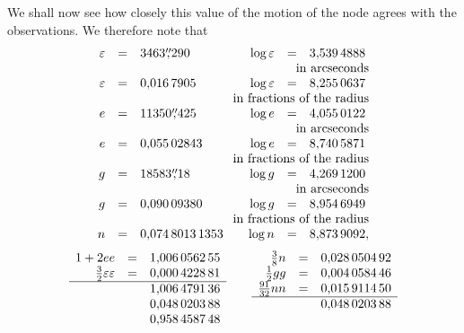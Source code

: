 \clearpage
\begingroup
{}
\renewcommand{\headrulewidth}{0pt}
\par\noindent\hspace*{\parindent}We shall now see how closely this value of the motion of the
node agrees with the observations. We therefore note that
\begingroup\small
\setlength{\arraycolsep}{2pt}
\renewcommand{\arraystretch}{1.15}
\[
\begin{array}{rcl@{\qquad}rcl}
\varepsilon&=&3463\overset{\prime\prime}{,}290
 &\log\varepsilon&=&3{,}539\,4888\\
\multicolumn{6}{r}{\text{in arcseconds}}\\
\varepsilon&=&0{,}016\,7905
 &\log\varepsilon&=&8{,}255\,0637\\
\multicolumn{6}{r}{\text{in fractions of the radius}}\\
e&=&11350\overset{\prime\prime}{,}425
 &\log e&=&4{,}055\,0122\\
\multicolumn{6}{r}{\text{in arcseconds}}\\
e&=&0{,}055\,02843
 &\log e&=&8{,}740\,5871\\
\multicolumn{6}{r}{\text{in fractions of the radius}}\\
g&=&18583\overset{\prime\prime}{,}18
 &\log g&=&4{,}269\,1200\\
\multicolumn{6}{r}{\text{in arcseconds}}\\
g&=&0{,}090\,09380
 &\log g&=&8{,}954\,6949\\
\multicolumn{6}{r}{\text{in fractions of the radius}}\\
n&=&0{,}074\,8013\,1353
 &\log n&=&8{,}873\,9092,
\end{array}
\]
\[
\begin{array}[t]{rcl}
1+2ee&=&1{,}006\,0562\,55\\
\tfrac32\varepsilon\varepsilon&=&0{,}000\,4228\,81\\
\hline
&&1{,}006\,4791\,36\\
&&0{,}048\,0203\,88\\
&&0{,}958\,4587\,48
\end{array}
\qquad
\begin{array}[t]{rcl}
\tfrac38n&=&0{,}028\,0504\,92\\
\tfrac12gg&=&0{,}004\,0584\,46\\
\tfrac{91}{32}nn&=&0{,}015\,9114\,50\\
\hline
&&0{,}048\,0203\,88
\end{array}
\]
\endgroup
{}
